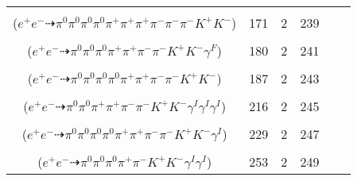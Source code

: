 \documentclass[landscape]{article}
\newcounter{rownumbers}
\newcommand\rn{\stepcounter{rownumbers}\arabic{rownumbers}}
\newcommand{\EOL}{\\} %
\newcommand{\topoTags}[1]{#1} %
\begin{document}
\begin{longtable}{clcccc}
\rn & \makecell[l]{ $ 
e^{+} e^{-} \rightarrow \pi^{0} \pi^{+} \pi^{+} \rho^{-} \rho^{-} \omega K^{+} K^{-} ,
\rho^{-} \rightarrow \pi^{0} \pi^{-} ,
\rho^{-} \rightarrow \pi^{0} \pi^{-} ,
\omega \rightarrow \pi^{0} \pi^{+} \pi^{-} 
$ \\ ($
e^{+} e^{-} \dashrightarrow \pi^{0} \pi^{0} \pi^{0} \pi^{0} \pi^{+} \pi^{+} \pi^{+} \pi^{-} \pi^{-} \pi^{-} K^{+} K^{-} 
$) } & \topoTags{171 & }2 & 239 \EOL

\rn & \makecell[l]{ $ 
e^{+} e^{-} \rightarrow \pi^{0} \pi^{0} \pi^{0} \rho^{0} \pi^{+} \pi^{-} K^{+} K^{-} ,
\rho^{0} \rightarrow \pi^{+} \pi^{-} \gamma^{F} 
$ \\ ($
e^{+} e^{-} \dashrightarrow \pi^{0} \pi^{0} \pi^{0} \pi^{+} \pi^{+} \pi^{-} \pi^{-} K^{+} K^{-} \gamma^{F} 
$) } & \topoTags{180 & }2 & 241 \EOL

\rn & \makecell[l]{ $ 
e^{+} e^{-} \rightarrow \pi^{0} \pi^{0} \pi^{0} \pi^{+} \pi^{-} \rho^{-} \bar{K}^{*} K^{+} ,
\rho^{-} \rightarrow \pi^{0} \pi^{-} ,
\bar{K}^{*} \rightarrow \pi^{+} K^{-} 
$ \\ ($
e^{+} e^{-} \dashrightarrow \pi^{0} \pi^{0} \pi^{0} \pi^{0} \pi^{+} \pi^{+} \pi^{-} \pi^{-} K^{+} K^{-} 
$) } & \topoTags{187 & }2 & 243 \EOL

\rn & \makecell[l]{ $ 
e^{+} e^{-} \rightarrow \pi^{-} \rho^{+} \omega K^{+} K^{-} \gamma^{I} \gamma^{I} \gamma^{I} ,
\rho^{+} \rightarrow \pi^{0} \pi^{+} ,
\omega \rightarrow \pi^{0} \pi^{+} \pi^{-} 
$ \\ ($
e^{+} e^{-} \dashrightarrow \pi^{0} \pi^{0} \pi^{+} \pi^{+} \pi^{-} \pi^{-} K^{+} K^{-} \gamma^{I} \gamma^{I} \gamma^{I} 
$) } & \topoTags{216 & }2 & 245 \EOL

\rn & \makecell[l]{ $ 
e^{+} e^{-} \rightarrow \pi^{0} \pi^{0} \pi^{0} \pi^{+} \pi^{+} \pi^{-} \pi^{-} K^{-} K^{*+} \gamma^{I} ,
K^{*+} \rightarrow \pi^{0} K^{+} 
$ \\ ($
e^{+} e^{-} \dashrightarrow \pi^{0} \pi^{0} \pi^{0} \pi^{0} \pi^{+} \pi^{+} \pi^{-} \pi^{-} K^{+} K^{-} \gamma^{I} 
$) } & \topoTags{229 & }2 & 247 \EOL

\rn & \makecell[l]{ $ 
e^{+} e^{-} \rightarrow \pi^{0} \pi^{0} \pi^{+} \rho^{-} K^{+} K^{-} \gamma^{I} \gamma^{I} ,
\rho^{-} \rightarrow \pi^{0} \pi^{-} 
$ \\ ($
e^{+} e^{-} \dashrightarrow \pi^{0} \pi^{0} \pi^{0} \pi^{+} \pi^{-} K^{+} K^{-} \gamma^{I} \gamma^{I} 
$) } & \topoTags{253 & }2 & 249 \EOL


\end{longtable}
\end{document}
